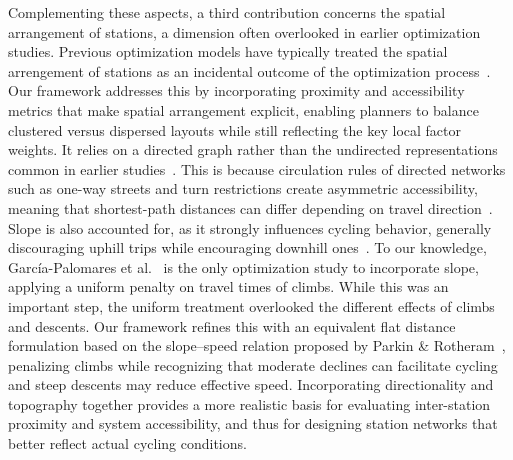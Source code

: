 Complementing these aspects, a third contribution concerns the spatial arrangement of stations, a dimension often overlooked in earlier optimization studies. Previous optimization models have typically treated the spatial arrengement of stations as an incidental outcome of the optimization process~\cite{Frade2015, Cintrano2018, Mete2018, Lin2011}. Our framework addresses this by incorporating proximity and accessibility metrics that make spatial arrangement explicit, enabling planners to balance clustered versus dispersed layouts while still reflecting the key local factor weights. It relies on a directed graph rather than the undirected representations common in earlier studies~\cite{Cintrano2018, Xin2013}. This is because circulation rules of directed networks such as one-way streets and turn restrictions create asymmetric accessibility, meaning that shortest-path distances can differ depending on travel direction~\cite{Melo2022}. Slope is also accounted for, as it strongly influences cycling behavior, generally discouraging uphill trips while encouraging downhill ones~\cite{MateoBabiano2016, Grau-Escolano2024}. To our knowledge, García-Palomares et al.~\cite{GarciaPalomares2012} is the only optimization study to incorporate slope, applying a uniform penalty on travel times of climbs. While this was an important step, the uniform treatment overlooked the different effects of climbs and descents. Our framework refines this with an equivalent flat distance formulation based on the slope–speed relation proposed by Parkin \& Rotheram~\cite{Parkin2010}, penalizing climbs while recognizing that moderate declines can facilitate cycling and steep descents may reduce effective speed. Incorporating directionality and topography together provides a more realistic basis for evaluating inter-station proximity and system accessibility, and thus for designing station networks that better reflect actual cycling conditions.

